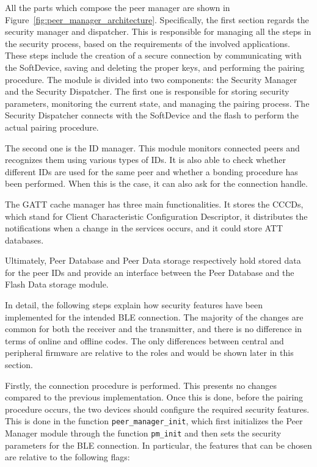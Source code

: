 \documentclass{Configuration_Files/PoliMi3i_thesis}
\begin{document}
All the parts which compose the peer manager are shown in Figure~\ref{fig:peer_manager_architecture}. Specifically, the first section regards the security manager and dispatcher. This is responsible for managing all the steps in the security process, based on the requirements of the involved applications. These steps include the creation of a secure connection by communicating with the SoftDevice, saving and deleting the proper keys, and performing the pairing procedure. The module is divided into two components: the Security Manager and the Security Dispatcher. The first one is responsible for storing security parameters, monitoring the current state, and managing the pairing process. The Security Dispatcher connects with the SoftDevice and the flash to perform the actual pairing procedure.

The second one is the ID manager. This module monitors connected peers and recognizes them using various types of IDs. It is also able to check whether different IDs are used for the same peer and whether a bonding procedure has been performed. When this is the case, it can also ask for the connection handle.

The GATT cache manager has three main functionalities. It stores the CCCDs, which stand for Client Characteristic Configuration Descriptor, it distributes the notifications when a change in the services occurs, and it could store ATT databases.

Ultimately, Peer Database and Peer Data storage respectively hold stored data for the peer IDs and provide an interface between the Peer Database and the Flash Data storage module.

In detail, the following steps explain how security features have been implemented for the intended BLE connection. The majority of the changes are common for both the receiver and the transmitter, and there is no difference in terms of online and offline codes. The only differences between central and peripheral firmware are relative to the roles and would be shown later in this section.

Firstly, the connection procedure is performed. This presents no changes compared to the previous implementation. Once this is done, before the pairing procedure occurs, the two devices should configure the required security features. This is done in the function \texttt{peer\_manager\_init}, which first initializes the Peer Manager module through the function \texttt{pm\_init} and then sets the security parameters for the BLE connection. In particular, the features that can be chosen are relative to the following flags:
\end{document}

